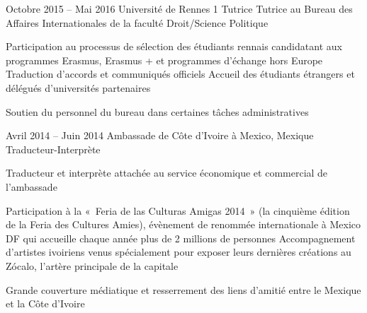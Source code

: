 \documentclass[30pt, french]{tccv}
\begin{document}
\begin{upshape}
\begin{competence}
\fontsize{10pt}{1.1em}\color{text}\bodyfontlight\upshape\selectfont %






\end{competence}




%
%


\begin{experience}

\vspace{0.5cm}
\item{\color{text} Octobre 2015 -- Mai 2016}
     {Université de Rennes 1}
     {Tutrice}
     \fontsize{10pt}{1.1em}\color{text}\bodyfontlight\upshape\selectfont
{} Tutrice au Bureau des Affaires Internationales de la faculté Droit/Science Politique \\
\sloppy
{}%
    \setlength{\parskip}{-10pt}
    \begin{itemize}
      \cvitem[\checkmark] Participation au processus de sélection des étudiants rennais candidatant aux programmes Erasmus, Erasmus + et pro\-grammes d’échange hors Europe
      \cvitem[\checkmark] Traduction d’accords et communiqués officiels
      \cvitem[\checkmark] Accueil des étudiants étrangers et délégués d’uni\-ver\-sités par\-tenaires
    \end{itemize}     
 Soutien du personnel du bureau dans certaines tâches administratives 



\vspace{0.5cm}
\item{Avril 2014 -- Juin 2014}
     {Ambassade de Côte d’Ivoire à Mexico, Mexique}
     {Traducteur-Interprète}
     \fontsize{10pt}{1.1em}\color{text}\bodyfontlight\upshape\selectfont

 Traducteur et interprète attachée au service économique et commercial de l’ambassade  \\
    \setlength{\parskip}{-10pt}
    \begin{itemize}
      \cvitem[\checkmark] Participation à la « Feria de las Culturas Amigas 2014 » (la cinquième édition de la Feria des Cultures Amies), évènement de renommée internationale à Mexico DF qui accueille chaque année plus de 2 millions de personnes
      \cvitem[\checkmark] Accompagnement d’artistes ivoiriens venus spécialement pour exposer leurs dernières créations au Zócalo, l’artère principale de la capitale
    \end{itemize}     
 Grande couverture médiatique et resserrement des liens d’amitié entre le Mexique et la Côte d’Ivoire



\end{experience}
\end{upshape}
\end{document}
